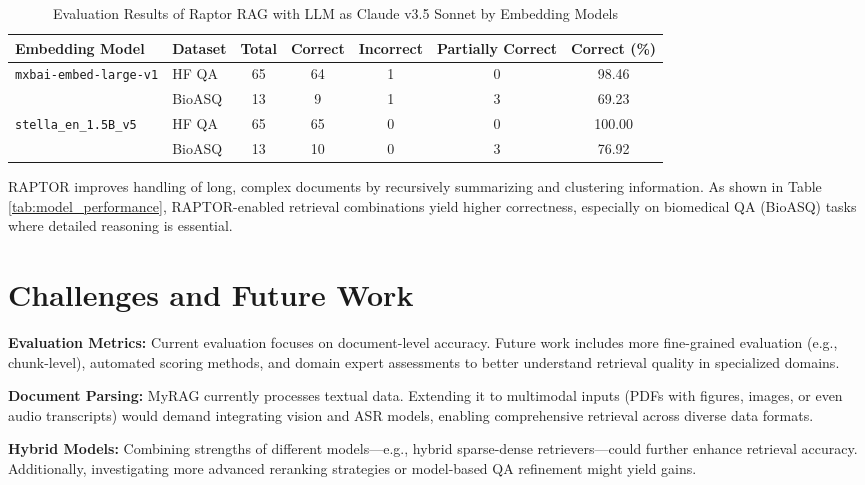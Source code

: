 \documentclass{scrartcl}
\begin{document}
\begin{table}[H]
\centering
\small
\begin{tabular}{l l c c c c c}
\hline
\textbf{Embedding Model} & \textbf{Dataset} & \textbf{Total} & \textbf{Correct} & \textbf{Incorrect} & \textbf{Partially Correct} & \textbf{Correct (\%)} \\
\hline
\multirow{2}{*}{\texttt{mxbai-embed-large-v1}} 
 & HF QA  & 65 & 64 & 1 & 0 & 98.46 \\
 & BioASQ & 13 & 9  & 1 & 3 & 69.23 \\
\hline
\multirow{2}{*}{\texttt{stella\_en\_1.5B\_v5}} 
 & HF QA  & 65 & 65 & 0 & 0 & 100.00 \\
 & BioASQ & 13 & 10 & 0 & 3 & 76.92 \\
\hline
\end{tabular}
\caption{Evaluation Results of Raptor RAG with LLM as Claude v3.5 Sonnet by Embedding Models}
\end{table}



RAPTOR improves handling of long, complex documents by recursively summarizing and clustering information. As shown in Table \ref{tab:model_performance}, RAPTOR-enabled retrieval combinations yield higher correctness, especially on biomedical QA (BioASQ) tasks where detailed reasoning is essential.

\section{Challenges and Future Work}

\textbf{Evaluation Metrics:} Current evaluation focuses on document-level accuracy. Future work includes more fine-grained evaluation (e.g., chunk-level), automated scoring methods, and domain expert assessments to better understand retrieval quality in specialized domains.

\textbf{Document Parsing:} MyRAG currently processes textual data. Extending it to multimodal inputs (PDFs with figures, images, or even audio transcripts) would demand integrating vision and ASR models, enabling comprehensive retrieval across diverse data formats.

\textbf{Hybrid Models:} Combining strengths of different models—e.g., hybrid sparse-dense retrievers—could further enhance retrieval accuracy. Additionally, investigating more advanced reranking strategies or model-based QA refinement might yield gains.
\end{document}
